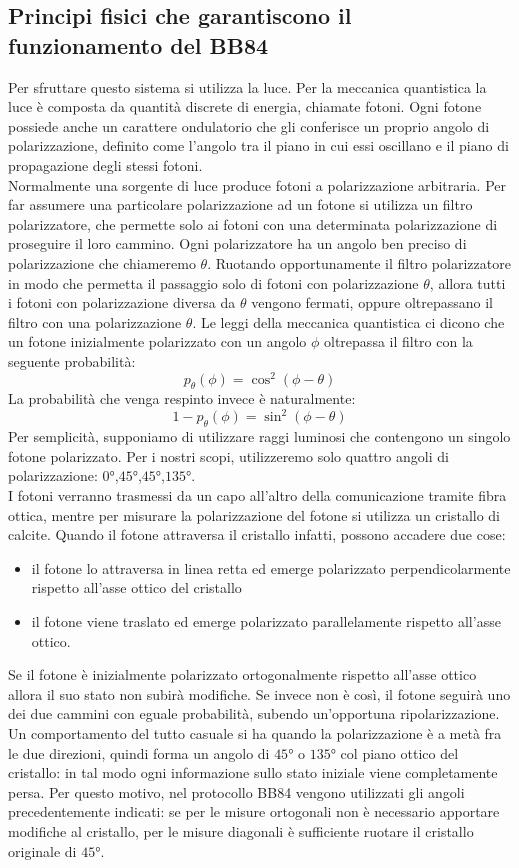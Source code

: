 \documentclass[italian,A4,12pt]{article}
\begin{document}
    \subsection{Principi fisici che garantiscono il funzionamento del BB84}
    Per sfruttare questo sistema si utilizza la luce. Per la meccanica quantistica la luce è composta da quantità discrete di energia, chiamate fotoni. Ogni fotone possiede anche un carattere ondulatorio che gli conferisce un proprio angolo di polarizzazione, definito come l'angolo tra il piano in cui essi oscillano e il piano di propagazione degli stessi fotoni.\\
    Normalmente una sorgente di luce produce fotoni a polarizzazione arbitraria. Per far assumere una particolare polarizzazione ad un fotone si utilizza un filtro polarizzatore, che permette solo ai fotoni con una determinata polarizzazione di proseguire il loro cammino. Ogni polarizzatore ha un angolo ben preciso di polarizzazione che chiameremo $\theta$.
    Ruotando opportunamente il filtro polarizzatore in modo che permetta il passaggio solo di fotoni con polarizzazione $\theta$, allora tutti i fotoni con polarizzazione diversa da $\theta$ vengono fermati, oppure oltrepassano il filtro con una polarizzazione $\theta$.
    Le leggi della meccanica quantistica ci dicono che un fotone inizialmente polarizzato con un angolo $\phi$ oltrepassa il filtro con la seguente probabilità:
    $$p_{\theta}(\phi)=\cos^2(\phi-\theta)$$
    La probabilità che venga respinto invece è naturalmente:
    $$1-p_{\theta}(\phi)=\sin^2(\phi-\theta)$$
    Per semplicità, supponiamo di utilizzare raggi luminosi che contengono un singolo fotone polarizzato.
    Per i nostri scopi, utilizzeremo solo quattro angoli di polarizzazione: $\ang{0}$,$\ang{45}$,$\ang{45}$,$\ang{135}$.\\
    I fotoni verranno trasmessi da un capo all'altro della comunicazione tramite fibra ottica, mentre per misurare la polarizzazione del fotone si utilizza un cristallo di calcite. Quando il fotone attraversa il cristallo infatti, possono accadere due cose:
    \begin{itemize}
      \item il fotone lo attraversa in linea retta ed emerge polarizzato perpendicolarmente rispetto all'asse ottico del cristallo
      \item il fotone viene traslato ed emerge polarizzato parallelamente rispetto all'asse ottico.
    \end{itemize}
    Se il fotone è inizialmente polarizzato ortogonalmente rispetto all'asse ottico allora il suo stato non subirà modifiche. Se invece non è così, il fotone seguirà uno dei due cammini con eguale probabilità, subendo un'opportuna ripolarizzazione. Un comportamento del tutto casuale si ha quando la polarizzazione è a metà fra le due direzioni, quindi forma un angolo di $\ang{45}$ o $\ang{135}$ col piano ottico del cristallo: in tal modo ogni informazione sullo stato iniziale viene completamente persa.
    Per questo motivo, nel protocollo BB84 vengono utilizzati gli angoli precedentemente indicati: se per le misure ortogonali non è necessario apportare modifiche al cristallo, per le misure diagonali è sufficiente ruotare il cristallo originale di $\ang{45}$.
\end{document}
